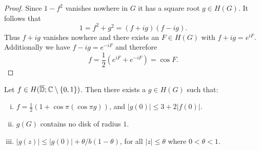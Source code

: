 \begin{proof}
    Since $1 - f^2$ vanishes nowhere in $G$ it has a square root $g \in H(G)$. It follows that
    $$ 1 = f^2 + g^2 = (f + ig)(f - ig). $$
    Thus $f + ig$ vanishes nowhere and there exists an $F \in H(G)$ with $f + ig = e^{iF}$. Additionally we have $f - ig = e^{-iF}$ and therefore
    $$ f = {\textstyle \frac{1}{2}} (e^{iF} + e^{-iF}) = \cos F. $$
\end{proof}

\begin{lemma} \label{lem:schottky-3}
    Let $f \in H(\overline{\mathbb{D}}; \mathbb{C} \setminus \{ 0, 1 \})$. Then there exists a $g \in H(G)$ such that:
    \begin{enumerate}[i.]
        \item $f = \frac{1}{2} ( 1 + \cos \pi (\cos \pi g))$, and $\vert g(0) \vert \leq 3 + 2 \vert f(0) \vert$.
        \item $g(G)$ contains no disk of radius $1$.
        \item $\vert g(z) \vert \leq \vert g(0) \vert + \theta / b (1 - \theta)$, for all $\vert z \vert \leq \theta$ where $0 < \theta < 1$.
    \end{enumerate}
\end{lemma}

